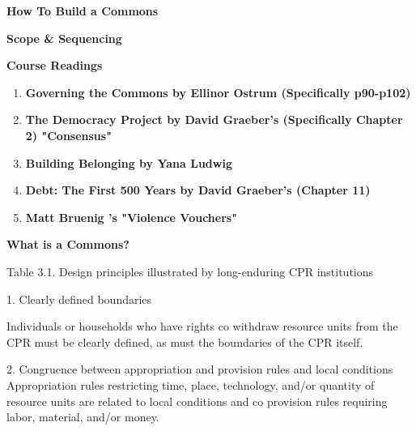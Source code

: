 \documentclass{article}
\begin{document}
	
{\huge \textbf{How To Build a Commons}}

\vspace{1cm}

{\Large \textbf{Scope \& Sequencing}}

\vspace{1cm}

{\huge \textbf{Course Readings}}

\begin{enumerate}
	
	\item \textbf{ Governing the Commons  by Ellinor Ostrum (Specifically p90-p102) } 
	
	

	\item \textbf{The Democracy Project by David Graeber's  (Specifically Chapter 2)  "Consensus"}
	
	
	\item \textbf{Building Belonging by Yana Ludwig}
	
	
	\item \textbf{Debt: The First 500 Years by David Graeber's  (Chapter 11)}
	
	
	\item \textbf{Matt Bruenig 's "Violence Vouchers"} 
	

	
\end{enumerate}

\pagebreak
{\huge \textbf{What is a Commons?}}

Table 3.1. Design principles illustrated by long-enduring CPR institutions

1. Clearly defined boundaries

Individuals or households who have rights co withdraw resource units from the CPR must be clearly defined, as must the boundaries of the CPR itself.

2. Congruence between appropriation and provision rules and local conditions Appropriation rules restricting time, place, technology, and/or quantity of resource units are related to local conditions and co provision rules requiring labor, material, and/or money.
\end{document}
